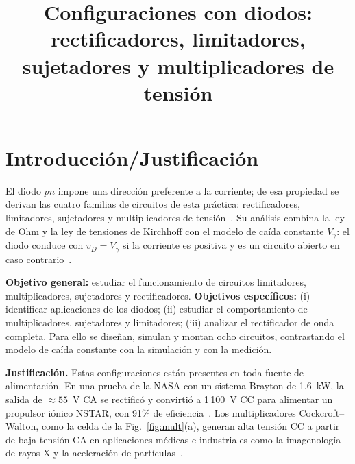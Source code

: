 \documentclass[conference,10pt]{IEEEtran}
\newcommand{\Vg}{V_\gamma}
\begin{document}
\title{Configuraciones con diodos: rectificadores, limitadores,\\
sujetadores y multiplicadores de tensión}

\author{
\and
{}
\and
{}
}

\maketitle

\section{Introducción/Justificación}
El diodo $pn$ impone una dirección preferente a la corriente; de esa
propiedad se derivan las cuatro familias de circuitos de esta práctica:
rectificadores, limitadores, sujetadores y multiplicadores de
tensión~\cite{sedra}. Su análisis combina la ley de Ohm y la ley de
tensiones de Kirchhoff con el modelo de caída constante $\Vg$: el diodo
conduce con $v_D=\Vg$ si la corriente es positiva y es un circuito
abierto en caso contrario~\cite{sedra}.

\textbf{Objetivo general:} estudiar el funcionamiento de circuitos
limitadores, multiplicadores, sujetadores y rectificadores.
\textbf{Objetivos específicos:} (i) identificar aplicaciones de los
diodos; (ii) estudiar el comportamiento de multiplicadores,
sujetadores y limitadores; (iii) analizar el rectificador de onda
completa. Para ello se diseñan, simulan y montan ocho circuitos,
contrastando el modelo de caída constante con la simulación y con la
medición.

\textbf{Justificación.} Estas configuraciones están presentes en toda
fuente de alimentación. En una prueba de la NASA con un sistema Brayton
de 1.6~kW, la salida de $\approx55$~V CA se rectificó y convirtió a
1\,100~V CC para alimentar un propulsor iónico NSTAR, con 91\% de
eficiencia~\cite{nasep}. Los multiplicadores Cockcroft--Walton, como la
celda de la Fig.~\ref{fig:mult}(a), generan alta tensión CC a partir de
baja tensión CA en aplicaciones médicas e industriales como la
imagenología de rayos X y la aceleración de partículas~\cite{park}.
\end{document}
